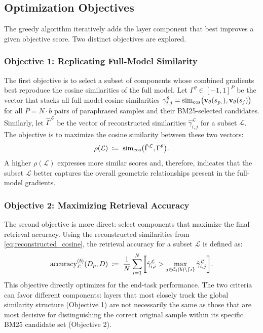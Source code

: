 \subsection{Optimization Objectives}
The greedy algorithm iteratively adds the layer component that best improves a given objective score. Two distinct objectives are explored.

\subsubsection{Objective 1: Replicating Full-Model Similarity}
The first objective is to select a subset of components whose combined gradients best reproduce the cosine similarities of the full model. Let $\Gamma^\theta \in [-1, 1]^P$ be the vector that stacks all full-model cosine similarities $\gamma_{i,j}^{\theta} = \operatorname{sim}_{\cos}\bigl(\mathbf{v}_{\theta}(s_{p_i}),\mathbf{v}_{\theta}(s_j)\bigr)$ for all $P = N \cdot b$ pairs of paraphrased samples and their BM25-selected candidates. Similarly, let $\hat{\Gamma}^{\mathcal{L}}$ be the vector of reconstructed similarities $\hat{\gamma}^{\mathcal{L}}_{i,j}$ for a subset $\mathcal{L}$. The objective is to maximize the cosine similarity between these two vectors:
\begin{equation}
\rho(\mathcal{L}) \;\coloneqq\;
\operatorname{sim}_{\cos}\bigl(\hat{\Gamma}^{\mathcal{L}}, \Gamma^\theta\bigr).
\label{eq:rho_objective}
\end{equation}
A higher $\rho(\mathcal{L})$ expresses more similar scores and, therefore, indicates that the subset $\mathcal{L}$ better captures the overall geometric relationships present in the full-model gradients.

\subsubsection{Objective 2: Maximizing Retrieval Accuracy}
The second objective is more direct: select components that maximize the final retrieval accuracy. Using the reconstructed similarities from \autoref{eq:reconstructed_cosine}, the retrieval accuracy for a subset $\mathcal{L}$ is defined as:
\begin{equation}
\operatorname{accuracy}^{(b)}_{\mathcal{L}}(D_p,D)
\;\coloneqq\;
\frac{1}{N}\sum_{i=1}^{N}
\Iverson*{
\hat{\gamma}^{\mathcal{L}}_{i,i}
>
\max_{j\in\mathcal{C}_i(b)\setminus\{i\}}
\hat{\gamma}^{\mathcal{L}}_{i,j}
}
.
\label{eq:accuracy_bm25_reconstructed}
\end{equation}
This objective directly optimizes for the end-task performance. The two criteria can favor different components: layers that most closely track the global similarity structure (Objective 1) are not necessarily the same as those that are most decisive for distinguishing the correct original sample within its specific BM25 candidate set (Objective 2).

